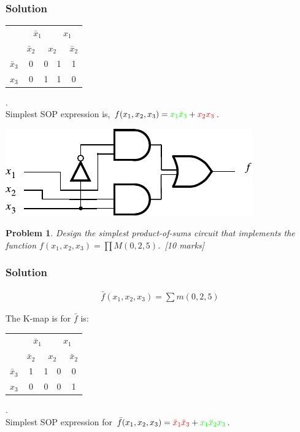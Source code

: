 \documentclass[twocolumn]{article}
\newtheorem{prob}{Problem}
\newcommand{\bx}{\bar{x}}
\begin{document}
\subsubsection*{Solution}

\begin{tabular}{c|c|c|c|c}
  \toprule
  & \multicolumn{2}{c|}{$\bx_1$} & \multicolumn{2}{c}{$x_1$}
  \\
  & $\bx_2$ & \multicolumn{2}{c|}{$x_2$} & $\bx_2$
  \\ \midrule
  $\bx_3$ & 0 & 0 & {\color{green}1} & {\color{green}1}
  \\
  $x_3$ & 0 & {\color{red}1} & {\color{red}1} & 0
  \\\bottomrule
\end{tabular}.
\\
Simplest SOP expression is, $f(x_1, x_2, x_3) = {\color{green}x_1 \bx_3} +
{\color{red}x_2 x_3} $.

\includegraphics[width=\linewidth]{fig/prob-7-sop-circuit.pdf}

\begin{prob}
Design the simplest product-of-sums circuit that implements the function $f (x_1 , x_2 , x_3 ) = \prod M (0, 2, 5)$.~\cite[Prob 2.22]{brown2013fundamentals}[10 marks]
\end{prob}
\subsubsection*{Solution}
\begin{align}
\bar{f}(x_1, x_2, x_3) = \sum m(0, 2, 5)
\end{align}

The K-map is for $\bar{f}$ is:
\begin{tabular}{c|c|c|c|c}
  \toprule
  & \multicolumn{2}{c|}{$\bx_1$} & \multicolumn{2}{c}{$x_1$}
  \\
  & $\bx_2$ & \multicolumn{2}{c|}{$x_2$} & $\bx_2$
  \\ \midrule
  $\bx_3$ & {\color{red}1} & {\color{red}1} & 0 & 0
  \\
  $x_3$ & 0 & 0 & 0 & {\color{green}1}
  \\\bottomrule
\end{tabular}.
\\
Simplest SOP expression for $\bar{f}(x_1, x_2, x_3) = {\color{red}\bx_1 \bx_3} + {\color{green}x_1\bx_2 x_3}$.
\end{document}
